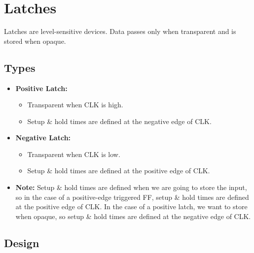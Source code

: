 \documentclass[11pt]{article}
\begin{document}
\section*{Latches}
Latches are level-sensitive devices. Data passes only when transparent and is stored when opaque.
\subsection*{Types}
\begin{itemize}
    \item \textbf{Positive Latch:}
        \begin{itemize}
            \item Transparent when CLK is high.
            \item Setup \& hold times are defined at the negative edge of CLK.
        \end{itemize}   
    \item \textbf{Negative Latch:}
        \begin{itemize}
            \item Transparent when CLK is low.
            \item Setup \& hold times are defined at the positive edge of CLK.
        \end{itemize}
    \item \textbf{Note:}
    Setup \& hold times are defined when we are going to store the input, so in the case of a positive-edge triggered FF, setup \& hold times are defined at the positive edge of CLK. In the case of a positive latch, we want to store when opaque, so setup \& hold times are defined at the negative edge of CLK.
\end{itemize}

\pagebreak

\subsection*{Design}
\end{document}
